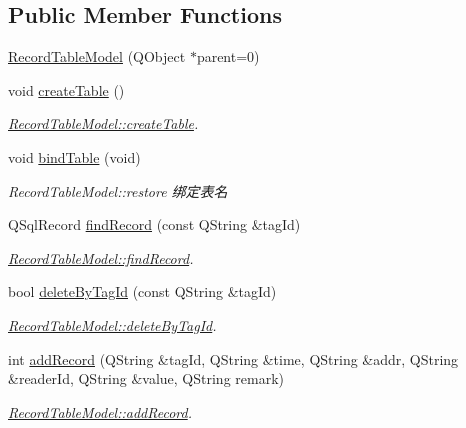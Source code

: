 \subsection*{Public Member Functions}
\begin{DoxyCompactItemize}
\item 
\mbox{\hyperlink{class_record_table_model_a003ba0c419c1f3667db260a9fba46421}{Record\+Table\+Model}} (Q\+Object $\ast$parent=0)
\item 
void \mbox{\hyperlink{class_record_table_model_a22b3345225e4d7e7e30ca0001c5c35a3}{create\+Table}} ()
\begin{DoxyCompactList}\small\item\em \mbox{\hyperlink{class_record_table_model_a22b3345225e4d7e7e30ca0001c5c35a3}{Record\+Table\+Model\+::create\+Table}}. \end{DoxyCompactList}\item 
void \mbox{\hyperlink{class_record_table_model_ae2ecb2c724b2141b50664525ad4cdfe7}{bind\+Table}} (void)
\begin{DoxyCompactList}\small\item\em Record\+Table\+Model\+::restore 绑定表名 \end{DoxyCompactList}\item 
Q\+Sql\+Record \mbox{\hyperlink{class_record_table_model_a80a5cfc5917b47971dfe567921809f6e}{find\+Record}} (const Q\+String \&tag\+Id)
\begin{DoxyCompactList}\small\item\em \mbox{\hyperlink{class_record_table_model_a80a5cfc5917b47971dfe567921809f6e}{Record\+Table\+Model\+::find\+Record}}. \end{DoxyCompactList}\item 
bool \mbox{\hyperlink{class_record_table_model_a100e9367452b370e3959d3694d911d22}{delete\+By\+Tag\+Id}} (const Q\+String \&tag\+Id)
\begin{DoxyCompactList}\small\item\em \mbox{\hyperlink{class_record_table_model_a100e9367452b370e3959d3694d911d22}{Record\+Table\+Model\+::delete\+By\+Tag\+Id}}. \end{DoxyCompactList}\item 
int \mbox{\hyperlink{class_record_table_model_a2dd9d26f03858e1393946baba8f14510}{add\+Record}} (Q\+String \&tag\+Id, Q\+String \&time, Q\+String \&addr, Q\+String \&reader\+Id, Q\+String \&value, Q\+String remark)
\begin{DoxyCompactList}\small\item\em \mbox{\hyperlink{class_record_table_model_a2dd9d26f03858e1393946baba8f14510}{Record\+Table\+Model\+::add\+Record}}. \end{DoxyCompactList}\end{DoxyCompactItemize}
